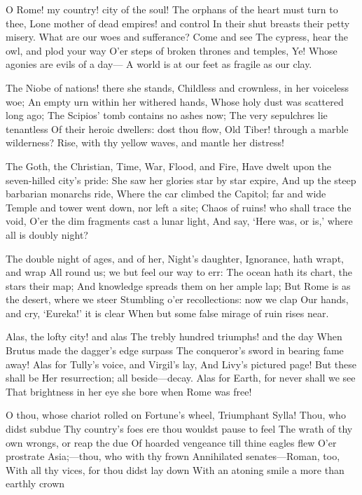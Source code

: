 \documentclass[10pt,twocolumn]{book}
\begin{document}
   O Rome! my country! city of the soul!
   The orphans of the heart must turn to thee,
   Lone mother of dead empires! and control
   In their shut breasts their petty misery.
   What are our woes and sufferance?  Come and see
   The cypress, hear the owl, and plod your way
   O'er steps of broken thrones and temples, Ye!
   Whose agonies are evils of a day---
A world is at our feet as fragile as our clay.


   The Niobe of nations! there she stands,
   Childless and crownless, in her voiceless woe;
   An empty urn within her withered hands,
   Whose holy dust was scattered long ago;
   The Scipios' tomb contains no ashes now;
   The very sepulchres lie tenantless
   Of their heroic dwellers:  dost thou flow,
   Old Tiber! through a marble wilderness?
Rise, with thy yellow waves, and mantle her distress!


   The Goth, the Christian, Time, War, Flood, and Fire,
   Have dwelt upon the seven-hilled city's pride:
   She saw her glories star by star expire,
   And up the steep barbarian monarchs ride,
   Where the car climbed the Capitol; far and wide
   Temple and tower went down, nor left a site;\textemdash
   Chaos of ruins! who shall trace the void,
   O'er the dim fragments cast a lunar light,
And say, `Here was, or is,' where all is doubly night?


   The double night of ages, and of her,
   Night's daughter, Ignorance, hath wrapt, and wrap
   All round us; we but feel our way to err:
   The ocean hath its chart, the stars their map;
   And knowledge spreads them on her ample lap;
   But Rome is as the desert, where we steer
   Stumbling o'er recollections:  now we clap
   Our hands, and cry, `Eureka!' it is clear\textemdash
When but some false mirage of ruin rises near.


   Alas, the lofty city! and alas
   The trebly hundred triumphs! and the day
   When Brutus made the dagger's edge surpass
   The conqueror's sword in bearing fame away!
   Alas for Tully's voice, and Virgil's lay,
   And Livy's pictured page!  But these shall be
   Her resurrection; all beside---decay.
   Alas for Earth, for never shall we see
That brightness in her eye she bore when Rome was free!


   O thou, whose chariot rolled on Fortune's wheel,
   Triumphant Sylla!  Thou, who didst subdue
   Thy country's foes ere thou wouldst pause to feel
   The wrath of thy own wrongs, or reap the due
   Of hoarded vengeance till thine eagles flew
   O'er prostrate Asia;---thou, who with thy frown
   Annihilated senates---Roman, too,
   With all thy vices, for thou didst lay down
With an atoning smile a more than earthly crown\textemdash
\end{document}
